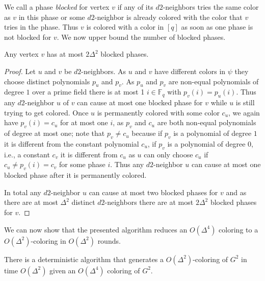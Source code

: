 We call a phase \emph{blocked} for vertex $v$ if any of its $d2$-neighbors tries the same color as $v$ in this phase or some $d2$-neighbor is already colored with the color that $v$ tries in the phase. Thus $v$ is colored with a color in $[q]$ as soon as one phase is not blocked for $v$. We now upper bound the number of blocked phases.
\begin{lemma}
\label{lem:blockedPhases}
 Any vertex $v$ has at most $2\Delta^2$ blocked phases. 
\end{lemma}
\begin{proof}
Let $u$ and $v$ be $d2$-neighbors. As $u$ and $v$ have different colors in $\psi$ they choose distinct polynomials $p_u$ and $p_v$. As $p_u$ and $p_v$ are non-equal polynomials of degree $1$ over a prime field there is at most 1 $i\in \mathbb{F}_q$ with $p_v(i)=p_u(i)$. Thus any $d2$-neighbor $u$ of $v$ can cause at most one blocked phase for $v$ while $u$ is still trying to get colored. Once $u$ is permanently colored with some color $c_u$, we again have $p_v(i)=c_u$ for at most one $i$, as $p_v$ and $c_u$ are both non-equal polynomials of degree at most one; note that $p_v\neq c_u$ because if $p_v$ is a polynomial of degree $1$ it is different from the constant polynomial $c_u$, if $p_v$ is a polynomial of degree $0$, i.e., a constant $c_v$ it is different from $c_u$ as $u$ can only choose $c_u$ if $c_u\neq p_v(i)=c_v$ for some phase $i$.  Thus any $d2$-neighbor $u$ can cause at most one blocked phase after it is permanently colored. 

In total any $d2$-neighbor $u$ can cause at most two blocked phases for $v$ and as there are at most $\Delta^2$ distinct $d2$-neighbors there are at most $2\Delta^2$ blocked phases for $v$.
\end{proof}
We can now show that the presented algorithm reduces an $O(\Delta^4)$ coloring to a $O(\Delta^2)$-coloring in $O(\Delta^2)$ rounds. 

\begin{theorem}
\label{thm:d2locIt}
There is a deterministic \congest algorithm that generates a $O(\Delta^2)$-coloring of $G^2$ in time $O(\Delta^2)$ given an $O(\Delta^4)$ coloring of $G^2$.
\end{theorem}


